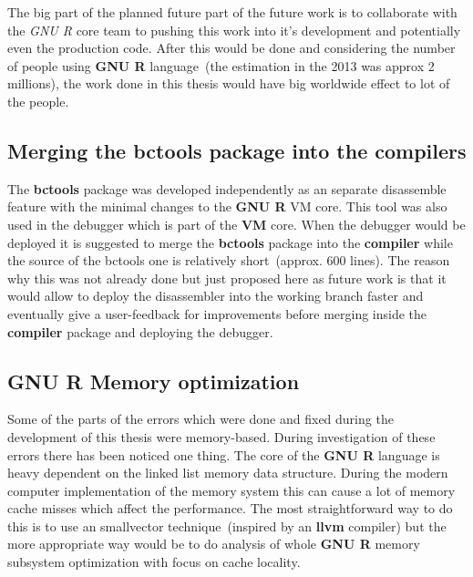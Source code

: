 \documentclass[thesis=M,english]{FITthesis}[2018/10/20]
\begin{document}
The big part of the planned future part of the future work is to collaborate with the \textit{GNU R} core team to pushing this work into it's development and potentially even the production code. After this would be done and considering the number of people using \textbf{GNU R} language~(the estimation in the 2013 was approx 2 millions), the work done in this thesis would have big worldwide effect to lot of the people.

\subsection{Merging the bctools package into the compilers}

The \textbf{bctools} package was developed independently as an separate disassemble feature with the minimal changes to the \textbf{GNU R} VM core. This tool was also used in the debugger which is part of the \textbf{VM} core. When the debugger would be deployed it is suggested to merge the \textbf{bctools} package into the \textbf{compiler} while the source of the bctools one is relatively short~(approx. 600 lines). The reason why this was not already done but just proposed here as future work is that it would allow to deploy the disassembler into the working branch faster and eventually give a user-feedback for improvements before merging inside the \textbf{compiler} package and deploying the debugger.

\subsection{GNU R Memory optimization}

Some of the parts of the errors which were done and fixed during the development of this thesis were memory-based. During investigation of these errors there has been noticed one thing. The core of the \textbf{GNU R} language is heavy dependent on the linked list memory data structure. During the modern computer implementation of the memory system this can cause a lot of memory cache misses which affect the performance. The most straightforward way to do this is to use an smallvector technique~(inspired by an \textbf{llvm} compiler) but the more appropriate way would be to do analysis of whole \textbf{GNU R} memory subsystem optimization with focus on cache locality.
\end{document}

